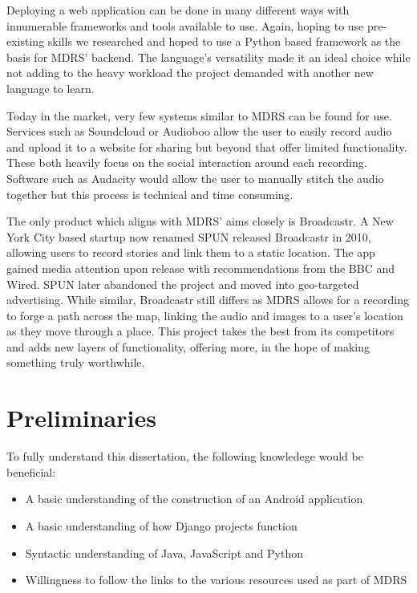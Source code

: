 \documentclass{l3proj}
\begin{document}
Deploying a web application can be done in many different ways with innumerable frameworks and tools available to use. Again, hoping to use pre-existing skills we researched and hoped to use a \gls{Python} based framework as the basis for MDRS’ backend.  The language's versatility made it an ideal choice while not adding to the heavy workload the project demanded with another new language to learn.

Today in the market, very few systems similar to MDRS can be found for use. Services such as Soundcloud or Audioboo allow the user to easily record audio and upload it to a website for sharing but beyond that offer limited functionality. These both heavily focus on the social interaction around each recording. Software such as Audacity would allow the user to manually stitch the audio together but this process is technical and time consuming.

The only product which aligns with MDRS' aims closely is Broadcastr. A New York City based startup now renamed SPUN released Broadcastr in 2010, allowing users to record stories and link them to a static location. The app gained media attention upon release with recommendations from the BBC and Wired. SPUN later abandoned the project and moved into geo-targeted advertising. While similar, Broadcastr still differs as MDRS allows for a recording to forge a path across the map, linking the audio and images to a user’s location as they move through a place. This project takes the best from its competitors and adds new layers of functionality, offering more, in the hope of making something truly worthwhile.

\section{Preliminaries}
To fully understand this dissertation, the following knowledege would be beneficial:
\begin{itemize}
\item A basic understanding of the construction of an Android application
\item A basic understanding of how \gls{Django} projects function
\item Syntactic understanding of Java, \gls{JavaScript} and \gls{Python}
\item Willingness to follow the links to the various resources used as part of MDRS
\end{itemize}

\end{document}
